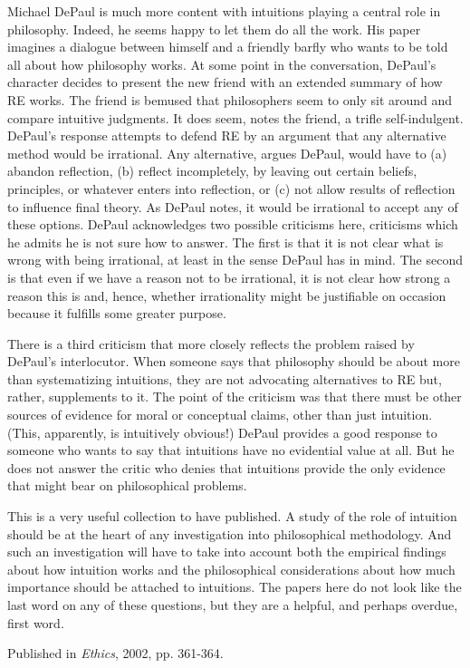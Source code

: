 \documentclass[
  10pt,
  letterpaper,
  DIV=11,
  numbers=noendperiod,
  twoside]{scrartcl}
\begin{document}
Michael DePaul is much more content with intuitions playing a central
role in philosophy. Indeed, he seems happy to let them do all the work.
His paper imagines a dialogue between himself and a friendly barfly who
wants to be told all about how philosophy works. At some point in the
conversation, DePaul's character decides to present the new friend with
an extended summary of how RE works. The friend is bemused that
philosophers seem to only sit around and compare intuitive judgments. It
does seem, notes the friend, a trifle self-indulgent. DePaul's response
attempts to defend RE by an argument that any alternative method would
be irrational. Any alternative, argues DePaul, would have to (a) abandon
reflection, (b) reflect incompletely, by leaving out certain beliefs,
principles, or whatever enters into reflection, or (c) not allow results
of reflection to influence final theory. As DePaul notes, it would be
irrational to accept any of these options. DePaul acknowledges two
possible criticisms here, criticisms which he admits he is not sure how
to answer. The first is that it is not clear what is wrong with being
irrational, at least in the sense DePaul has in mind. The second is that
even if we have a reason not to be irrational, it is not clear how
strong a reason this is and, hence, whether irrationality might be
justifiable on occasion because it fulfills some greater purpose.

There is a third criticism that more closely reflects the problem raised
by DePaul's interlocutor. When someone says that philosophy should be
about more than systematizing intuitions, they are not advocating
alternatives to RE but, rather, supplements to it. The point of the
criticism was that there must be other sources of evidence for moral or
conceptual claims, other than just intuition. (This, apparently, is
intuitively obvious!) DePaul provides a good response to someone who
wants to say that intuitions have no evidential value at all. But he
does not answer the critic who denies that intuitions provide the only
evidence that might bear on philosophical problems.

This is a very useful collection to have published. A study of the role
of intuition should be at the heart of any investigation into
philosophical methodology. And such an investigation will have to take
into account both the empirical findings about how intuition works and
the philosophical considerations about how much importance should be
attached to intuitions. The papers here do not look like the last word
on any of these questions, but they are a helpful, and perhaps overdue,
first word.



\noindent Published in\emph{
Ethics}, 2002, pp. 361-364.
\end{document}
